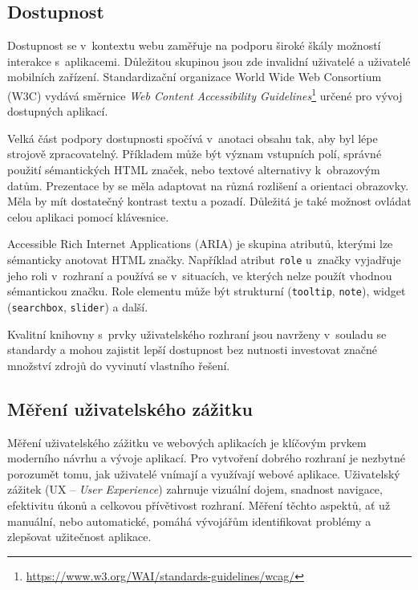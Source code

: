 \subsection{Dostupnost}

Dostupnost se v~kontextu webu zaměřuje na podporu široké škály možností interakce s~aplikacemi.
Důležitou skupinou jsou zde invalidní uživatelé a uživatelé mobilních zařízení.
Standardizační organizace World Wide Web Consortium (W3C) vydává směrnice \emph{Web Content Accessibility Guidelines}\footnote{\href{https://www.w3.org/WAI/standards-guidelines/wcag/}{https://www.w3.org/WAI/standards-guidelines/wcag/}} určené pro vývoj dostupných aplikací.

Velká část podpory dostupnosti spočívá v~anotaci obsahu tak, aby byl lépe strojově zpracovatelný.
Příkladem může být význam vstupních polí, správné použití sémantických HTML značek, nebo textové alternativy k~obrazovým datům.
Prezentace by se měla adaptovat na různá rozlišení a orientaci obrazovky.
Měla by mít dostatečný kontrast textu a pozadí.
Důležitá je také možnost ovládat celou aplikaci pomocí klávesnice.

Accessible Rich Internet Applications (ARIA) je skupina atributů, kterými lze sémanticky anotovat HTML značky.
Například atribut \texttt{role} u~značky vyjadřuje jeho roli v~rozhraní a používá se v~situacích, ve kterých nelze použít vhodnou sémantickou značku.
Role elementu může být strukturní (\texttt{tooltip}, \texttt{note}), widget (\texttt{searchbox}, \texttt{slider}) a další.

Kvalitní knihovny s~prvky uživatelského rozhraní jsou navrženy v~souladu se standardy a mohou zajistit lepší dostupnost bez nutnosti investovat značné množství zdrojů do vyvinutí vlastního řešení.

\subsection{Měření uživatelského zážitku}

Měření uživatelského zážitku ve webových aplikacích je klíčovým prvkem moderního návrhu a vývoje aplikací.
Pro vytvoření dobrého rozhraní je nezbytné porozumět tomu, jak uživatelé vnímají a využívají webové aplikace.
Uživatelský zážitek (UX -- \emph{User Experience}) zahrnuje vizuální dojem, snadnost navigace, efektivitu úkonů a celkovou přívětivost rozhraní.
Měření těchto aspektů, ať už manuální, nebo automatické, pomáhá vývojářům identifikovat problémy a zlepšovat užitečnost aplikace.

